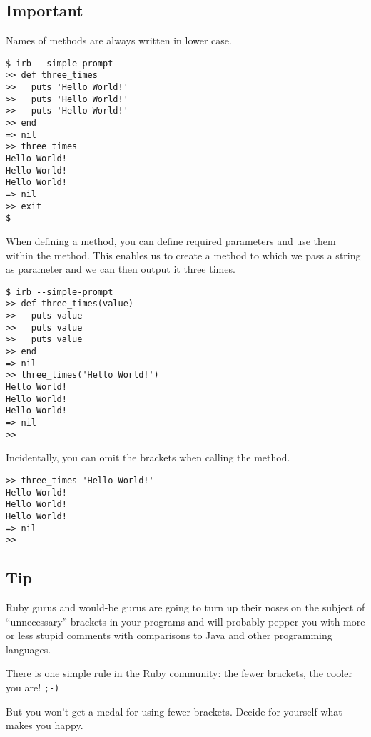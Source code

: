 \documentclass[a4paper]{book}
\begin{document}
\subsection{Important}\label{important}

Names of methods are always written in lower case.

\begin{shaded}\begin{verbatim}
$ irb --simple-prompt
>> def three_times
>>   puts 'Hello World!'
>>   puts 'Hello World!'
>>   puts 'Hello World!'
>> end
=> nil
>> three_times
Hello World!
Hello World!
Hello World!
=> nil
>> exit
$
\end{verbatim}\end{shaded}

When defining a method, you can define required parameters and use them within the method. This enables us to create a method to which we pass a string as parameter and we can then output it three times.

\begin{shaded}\begin{verbatim}
$ irb --simple-prompt
>> def three_times(value)
>>   puts value
>>   puts value
>>   puts value
>> end
=> nil
>> three_times('Hello World!')
Hello World!
Hello World!
Hello World!
=> nil
>>
\end{verbatim}\end{shaded}

Incidentally, you can omit the brackets when calling the method.

\begin{shaded}\begin{verbatim}
>> three_times 'Hello World!'
Hello World!
Hello World!
Hello World!
=> nil
>>
\end{verbatim}\end{shaded}

\subsection{Tip}\label{tip}

Ruby gurus and would-be gurus are going to turn up their noses on the subject of “unnecessary” brackets in your programs and will probably pepper you with more or less stupid comments with comparisons to Java and other programming languages.

There is one simple rule in the Ruby community: the fewer brackets, the cooler you are! \texttt{;-)}

But you won't get a medal for using fewer brackets. Decide for yourself what makes you happy.
\end{document}
